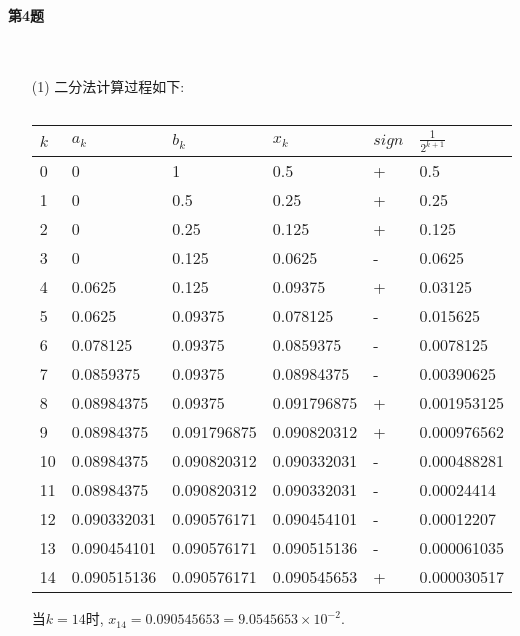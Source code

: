 \documentclass[a4paper]{article}
\begin{document}
\paragraph{第4题}~{}
\\

\begin{enumerate}
    \item [(1)]
    二分法计算过程如下: \par
    \begin{table}[h]
        \centering
        \caption{}
        \begin{tabular}{llllll}
        \hline
        $k$ & $a_k$ & $b_k$ & $x_k$ & $sign$ & $\frac{1}{2^{k+1}}$  \\ \hline
        0 &   0    & 1  & 0.5 &   + & 0.5 \\
        1 &   0    & 0.5  & 0.25 &  + & 0.25  \\
        2 &   0  & 0.25 & 0.125 &  + & 0.125  \\
        3 &   0  & 0.125 & 0.0625 & -  & 0.0625 \\
        4 &   0.0625  & 0.125 & 0.09375 & +  & 0.03125 \\
        5 &   0.0625  & 0.09375 & 0.078125 & -  & 0.015625 \\
        6 &   0.078125  & 0.09375 & 0.0859375 & -  & 0.0078125 \\
        7 &   0.0859375 & 0.09375 & 0.08984375 & -  & 0.00390625 \\
        8 &   0.08984375 & 0.09375 & 0.091796875 & +  & 0.001953125 \\
        9 &   0.08984375 & 0.091796875 & 0.090820312 & +  & 0.000976562 \\
        10 &   0.08984375 & 0.090820312 & 0.090332031 & -  & 0.000488281 \\
        11 &   0.08984375 & 0.090820312 & 0.090332031 & -  & 0.00024414 \\
        12 &   0.090332031 & 0.090576171 & 0.090454101 & -  & 0.00012207 \\
        13 &   0.090454101 & 0.090576171 & 0.090515136 & -  & 0.000061035 \\
        14 &   0.090515136 & 0.090576171 & 0.090545653 & +  & 0.000030517 \\
        \hline 
        \end{tabular}
        \end{table} \par
        当$k=14$时, $x_{14} = 0.090545653 = 9.0545653 \times 10^{-2}$.\par

\end{enumerate}
\end{document}
